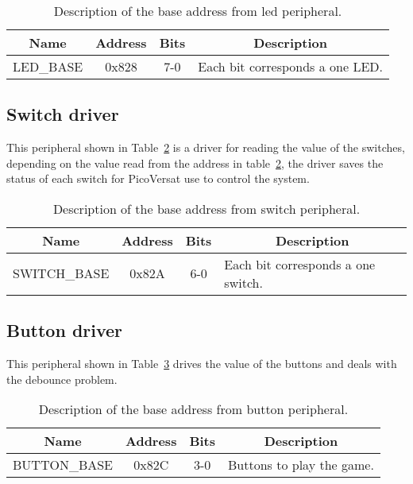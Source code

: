 \begin{table}[h]
\centering
\begin{tabular}{|l|c|c|l|}
\hline
\multicolumn{1}{|c|}{\bf Name} & {\bf Address} & {\bf Bits} & \multicolumn{1}{c|}{\bf Description} \\ 
\hline \hline
\multicolumn{1}{|l|}{LED\_BASE} & 0x828 & 7-0 & Each bit corresponds a one LED.\\ 
\hline
\end{tabular}
\caption{Description of the base address from led peripheral.}
\label{tab:led}
\end{table}


\subsection{Switch driver}
This peripheral shown in Table~\ref{tab:switch} is a driver for reading the value of the switches, depending on the value read from the address in table~\ref{tab:switch}, the driver saves the status of each switch for PicoVersat use to control the system.

\begin{table}[h]
\centering
\begin{tabular}{|l|c|c|l|}
\hline
\multicolumn{1}{|c|}{\bf Name} & {\bf Address} & {\bf Bits} & \multicolumn{1}{c|}{\bf Description} \\ 
\hline \hline
\multicolumn{1}{|l|}{SWITCH\_BASE} & 0x82A & 6-0 & Each bit corresponds a one switch.\\ 
\hline
\end{tabular}
\caption{Description of the base address from switch peripheral.}
\label{tab:switch}
\end{table}

\clearpage
\subsection{Button driver}
This peripheral shown in Table~\ref{tab:button} drives the value of the buttons and deals with the debounce problem.

\begin{table}[h]
\centering
\begin{tabular}{|l|c|c|l|}
\hline
\multicolumn{1}{|c|}{\bf Name} & {\bf Address} & {\bf Bits} & \multicolumn{1}{c|}{\bf Description} \\ 
\hline \hline
\multicolumn{1}{|l|}{BUTTON\_BASE} & 0x82C & 3-0 & Buttons to play the game. \\ 
\hline
\end{tabular}
\caption{Description of the base address from button peripheral.}
\label{tab:button}
\end{table}

